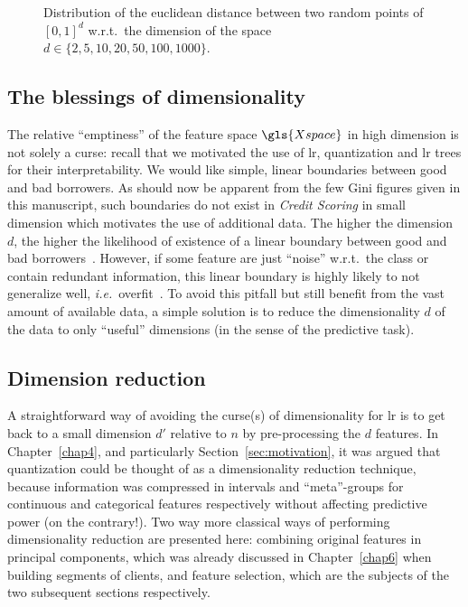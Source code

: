 \begin{figure}[!ht]
\centering
\resizebox{\textwidth}{!}{}
\caption{Distribution of the euclidean distance between two random points of $[0,1]^d$ w.r.t.\ the dimension of the space $d \in \{ 2, 5, 10, 20, 50, 100, 1000 \}$.}
\label{fig:distance}
\end{figure}


\subsection{The blessings of dimensionality}

The relative ``emptiness'' of the feature space $\gls{Xspace}$ in high dimension is not solely a curse: recall that we motivated the use of \gls{lr}, quantization and \gls{lr} trees for their interpretability. We would like simple, linear boundaries between good and bad borrowers. As should now be apparent from the few Gini figures given in this manuscript, such boundaries do not exist in \textit{Credit Scoring} in small dimension which motivates the use of additional data. The higher the dimension $d$, the higher the likelihood of existence of a linear boundary between good and bad borrowers~\cite{gorban2018blessing}. However, if some feature are just ``noise'' w.r.t.\ the class or contain redundant information, this linear boundary is highly likely to not generalize well, \textit{i.e.}\ overfit~\cite{bertrandagnan_2017}. To avoid this pitfall but still benefit from the vast amount of available data, a simple solution is to reduce the dimensionality $d$ of the data to only ``useful'' dimensions (in the sense of the predictive task).

\subsection{Dimension reduction}

A straightforward way of avoiding the curse(s) of dimensionality for \gls{lr} is to get back to a small dimension $d'$ relative to $n$ by pre-processing the $d$ features. In Chapter~\ref{chap4}, and particularly Section~\ref{sec:motivation}, it was argued that quantization could be thought of as a dimensionality reduction technique, because information was compressed in intervals and ``meta''-groups for continuous and categorical features respectively without affecting predictive power (on the contrary!). Two way more classical ways of performing dimensionality reduction are presented here: combining original features in principal components, which was already discussed in Chapter~\ref{chap6} when building segments of clients, and feature selection, which are the subjects of the two subsequent sections respectively.

